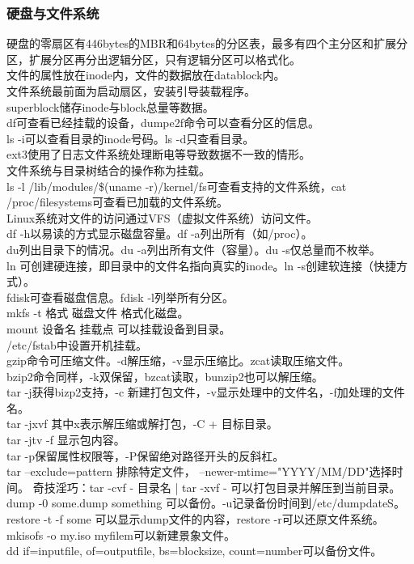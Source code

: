 \documentclass{ctexart}
\begin{document}
\subsubsection*{硬盘与文件系统}
\noindent 硬盘的零扇区有446bytes的MBR和64bytes的分区表，最多有四个主分区和扩展分区，扩展分区再分出逻辑分区，只有逻辑分区可以格式化。\\
\noindent 文件的属性放在inode内，文件的数据放在datablock内。\\
\noindent 文件系统最前面为启动扇区，安装引导装载程序。\\
\noindent superblock储存inode与block总量等数据。\\
\noindent df可查看已经挂载的设备，dumpe2f命令可以查看分区的信息。\\
\noindent ls -i可以查看目录的inode号码。ls -d只查看目录。\\
\noindent ext3使用了日志文件系统处理断电等导致数据不一致的情形。\\
\noindent 文件系统与目录树结合的操作称为挂载。\\
\noindent ls -l /lib/modules/\$(uname -r)/kernel/fs可查看支持的文件系统，cat /proc/filesystems可查看已加载的文件系统。\\
\noindent Linux系统对文件的访问通过VFS（虚拟文件系统）访问文件。\\
\noindent df -h以易读的方式显示磁盘容量。df -a列出所有（如/proc）。\\
\noindent du列出目录下的情况。du -a列出所有文件（容量）。du -s仅总量而不枚举。\\
\noindent ln 可创建硬连接，即目录中的文件名指向真实的inode。ln -s创建软连接（快捷方式）。\\
\noindent fdisk可查看磁盘信息。fdisk -l列举所有分区。\\
\noindent mkfs -t 格式 磁盘文件 格式化磁盘。\\
\noindent mount 设备名 挂载点 可以挂载设备到目录。\\
\noindent /etc/fstab中设置开机挂载。\\
\noindent gzip命令可压缩文件。-d解压缩，-v显示压缩比。zcat读取压缩文件。\\
\noindent bzip2命令同样，-k双保留，bzcat读取，bunzip2也可以解压缩。\\
\noindent tar -j获得bizp2支持，-c 新建打包文件，-v显示处理中的文件名，-f加处理的文件名。\\
\noindent tar -jxvf 其中x表示解压缩或解打包，-C + 目标目录。\\
\noindent tar -jtv -f 显示包内容。\\
\noindent tar -p保留属性权限等，-P保留绝对路径开头的反斜杠。\\
\noindent tar --exclude=pattern 排除特定文件， --newer-mtime="YYYY/MM/DD"选择时间。 
\noindent 奇技淫巧：tar -cvf - 目录名 | tar -xvf - 可以打包目录并解压到当前目录。\\
\noindent dump -0 some.dump something 可以备份。-u记录备份时间到/etc/dumpdateS。\\
\noindent restore -t -f some 可以显示dump文件的内容，restore -r可以还原文件系统。\\
\noindent mkisofs -o my.iso myfilem可以新建景象文件。\\
\noindent dd if=inputfile, of=outputfile, bs=blocksize, count=number可以备份文件。
\end{document}
